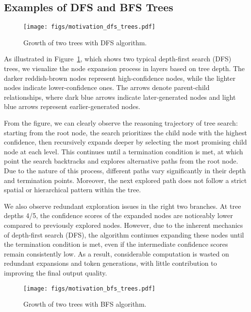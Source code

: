 \subsection{Examples of DFS and BFS Trees}
\label{sec:app:trees}

\begin{figure}[ht]
    \centering
    \texttt{[image: figs/motivation\_dfs\_trees.pdf]}
    \caption{Growth of two trees with DFS algorithm. }
    \label{fig:motivation_dfs_trees}
\end{figure}

As illustrated in Figure~\ref{fig:motivation_dfs_trees}, which shows two typical depth-first search (DFS) trees, we visualize the node expansion process in layers based on tree depth. 
The darker reddish-brown nodes represent high-confidence nodes, while the lighter nodes indicate lower-confidence ones. The arrows denote parent-child relationships, where dark blue arrows indicate later-generated nodes and light blue arrows represent earlier-generated nodes. 

From the figure, we can clearly observe the reasoning trajectory of tree search: starting from the root node, the search prioritizes the child node with the highest confidence, then recursively expands deeper by selecting the most promising child node at each level. This continues until a termination condition is met, at which point the search backtracks and explores alternative paths from the root node. Due to the nature of this process, different paths vary significantly in their depth and termination points. Moreover, the next explored path does not follow a strict spatial or hierarchical pattern within the tree.

We also observe redundant exploration issues in the right two branches. At tree depths 4/5, the confidence scores of the expanded nodes are noticeably lower compared to previously explored nodes. However, due to the inherent mechanics of depth-first search (DFS), the algorithm continues expanding these nodes until the termination condition is met, even if the intermediate confidence scores remain consistently low. As a result, considerable computation is wasted on redundant expansions and token generations, with little contribution to improving the final output quality.


\begin{figure}[ht]
    \centering
    \texttt{[image: figs/motivation\_bfs\_trees.pdf]}
    \caption{Growth of two trees with BFS algorithm. }
    \label{fig:motivation_bfs_trees}
\end{figure}

